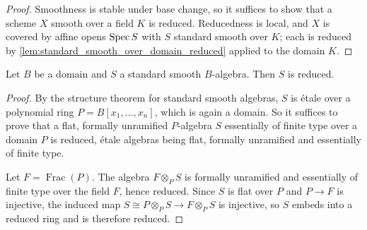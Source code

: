 \begin{proof}
  \leanok
  Smoothness is stable under base change, so it suffices to show that a scheme
  \(X\) smooth over a field \(K\) is reduced. Reducedness is local, and \(X\) is
  covered by affine opens \(\operatorname{Spec} S\) with \(S\) standard smooth over \(K\); each
  is reduced by \cref{lem:standard_smooth_over_domain_reduced} applied to the
  domain \(K\).
\end{proof}

\begin{lemma}
  \label{lem:standard_smooth_over_domain_reduced}
  \leanok
  Let \(B\) be a domain and \(S\) a standard smooth \(B\)-algebra. Then \(S\) is
  reduced.
\end{lemma}

\begin{proof}
  \leanok
  By the structure theorem for standard smooth algebras, \(S\) is étale over a
  polynomial ring \(P=B[x_1,\dots,x_n]\), which is again a domain. So it suffices
  to prove that a flat, formally unramified \(P\)-algebra \(S\) essentially of
  finite type over a domain \(P\) is reduced, étale algebras being flat, formally
  unramified and essentially of finite type.

  Let \(F=\operatorname{Frac}(P)\). The algebra \(F\otimes_P S\) is formally
  unramified and essentially of finite type over the field \(F\), hence reduced.
  Since \(S\) is flat over \(P\) and \(P\to F\) is injective, the induced map
  \(S\cong P\otimes_P S\to F\otimes_P S\) is injective, so \(S\) embeds into a
  reduced ring and is therefore reduced.
\end{proof}


